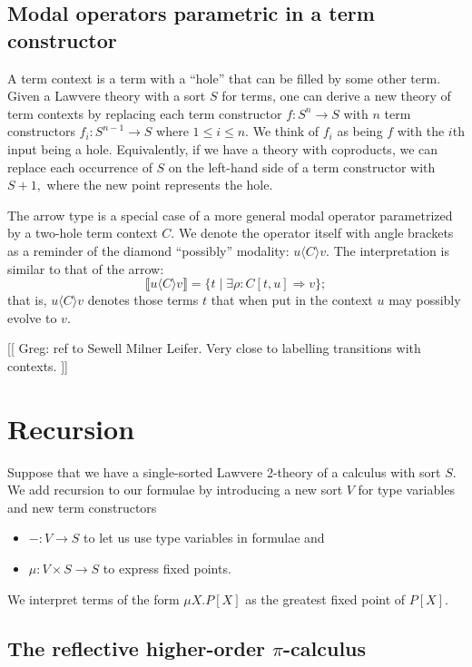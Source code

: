 \documentclass{llncs}
\newcommand{\interp}[1]{\llbracket #1 \rrbracket}
\newcommand{\maps}{\colon}
\begin{document}
\subsection{Modal operators parametric in a term constructor}

A term context is a term with a ``hole'' that can be filled by some other term.  Given a Lawvere theory with a sort $S$ for terms, one can derive a new theory of term contexts by replacing each term constructor $f\maps S^n \to S$ with $n$ term constructors $f_i\maps S^{n-1} \to S$ where $1 \le i \le n$.  We think of $f_i$ as being $f$ with the $i$th input being a hole.  Equivalently, if we have a theory with coproducts, we can replace each occurrence of $S$ on the left-hand side of a term constructor with $S+1,$ where the new point represents the hole.

The arrow type is a special case of a more general modal operator parametrized by a two-hole term context $C.$  We denote the operator itself with angle brackets as a reminder of the diamond ``possibly'' modality: $u \langle C \rangle v.$  The interpretation is similar to that of the arrow:
\[ \interp{u \langle C\rangle v} = \{ t \;|\; \exists \rho\maps C[t, u] \Rightarrow v \}; \]
that is, $u \langle C\rangle v$ denotes those terms $t$ that when put in the context $u$ may possibly evolve to $v.$

[[ Greg: ref to Sewell Milner Leifer.  Very close to labelling transitions with contexts. ]]

\section{Recursion}

Suppose that we have a single-sorted Lawvere 2-theory of a calculus with sort $S$.  We add recursion to our formulae by introducing a new sort $V$ for type variables and new term constructors 
\begin{itemize}
  \item $- \maps V \to S$ to let us use type variables in formulae and
  \item $\mu\maps V\times S \to S$ to express fixed points.
\end{itemize}

We interpret terms of the form $\mu X.P[X]$ as the greatest fixed point of $P[X].$

\subsection{The reflective higher-order $\pi$-calculus}
\end{document}
